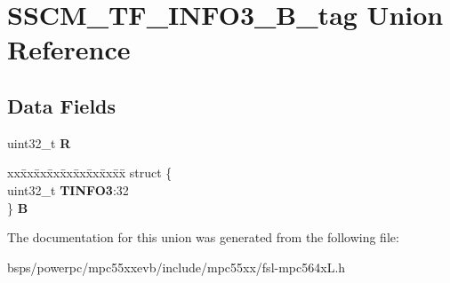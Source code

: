 \hypertarget{unionSSCM__TF__INFO3__32B__tag}{}\section{S\+S\+C\+M\+\_\+\+T\+F\+\_\+\+I\+N\+F\+O3\+\_\+B\+\_\+tag Union Reference}
\label{unionSSCM__TF__INFO3__32B__tag}
\subsection*{Data Fields}
\begin{DoxyCompactItemize}
\item 
\mbox{\label{unionSSCM__TF__INFO3__32B__tag_aa47daa2e772542cb82af265035438057}} 
uint32\+\_\+t {\bfseries R}
\item 
\mbox{\label{unionSSCM__TF__INFO3__32B__tag_a0afdf446470392153fb8934d5c8d1b77}} 
\begin{tabbing}
xx\=xx\=xx\=xx\=xx\=xx\=xx\=xx\=xx\=\kill
struct \{\\
\>uint32\_t {\bfseries TINFO3}:32\\
\} {\bfseries B}\\

\end{tabbing}\end{DoxyCompactItemize}


The documentation for this union was generated from the following file\+:\begin{DoxyCompactItemize}
\item 
bsps/powerpc/mpc55xxevb/include/mpc55xx/fsl-\/mpc564x\+L.\+h\end{DoxyCompactItemize}
